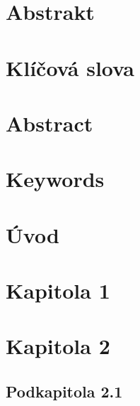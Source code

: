 \documentclass[a4paper,11pt,titlepage,fleqn]{article}
\begin{document}


\setcounter{page}{3}

\newpage
\thispagestyle{plain}
\section*{Abstrakt}


\section*{Klíčová slova}


\thispagestyle{empty}
\newpage

\section*{Abstract}

\section*{Keywords}


\thispagestyle{empty}

\newpage
\tableofcontents
\newpage
\listoffigures
\listoftables
\lstlistoflistings
\newpage
\printglossary[type=\acronymtype,title=Seznam zkratek]
\cleardoublepage


\section{Úvod}


\newpage
\section{Kapitola 1}

\newpage
\section{Kapitola 2}
    \label{kapitola}

    \subsection{Podkapitola 2.1} 
        \label{kapitola21}

\end{document}
